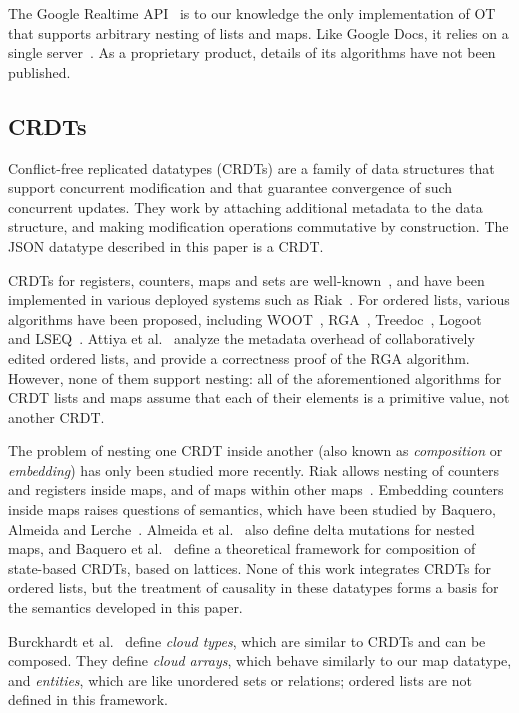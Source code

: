 \documentclass[10pt,journal,compsoc]{IEEEtran}
\begin{document}
The Google Realtime API~\cite{Google:2015vk} is to our knowledge the only implementation of OT that supports arbitrary nesting of lists and maps. Like Google Docs, it relies on a single server~\cite{Lemonik:2016wh}. As a proprietary product, details of its algorithms have not been published.

\subsection{CRDTs}\label{sec:related-crdts}

Conflict-free replicated datatypes (CRDTs) are a family of data structures that support concurrent modification and that guarantee convergence of such concurrent updates. They work by attaching additional metadata to the data structure, and making modification operations commutative by construction. The JSON datatype described in this paper is a CRDT.

CRDTs for registers, counters, maps and sets are well-known~\cite{Shapiro:2011un,Shapiro:2011wy}, and have been implemented in various deployed systems such as Riak~\cite{Brown:2014hs,Brown:2013wy}. For ordered lists, various algorithms have been proposed, including WOOT~\cite{Oster:2006wj}, RGA~\cite{Roh:2011dw}, Treedoc~\cite{Preguica:2009fz}, Logoot~\cite{Weiss:2010hx} and LSEQ~\cite{Nedelec:2013ky}. Attiya et al.~\cite{Attiya:2016kh} analyze the metadata overhead of collaboratively edited ordered lists, and provide a correctness proof of the RGA algorithm. However, none of them support nesting: all of the aforementioned algorithms for CRDT lists and maps assume that each of their elements is a primitive value, not another CRDT.

The problem of nesting one CRDT inside another (also known as \emph{composition} or \emph{embedding}) has only been studied more recently. Riak allows nesting of counters and registers inside maps, and of maps within other maps~\cite{Brown:2014hs,Brown:2013wy}. Embedding counters inside maps raises questions of semantics, which have been studied by Baquero, Almeida and Lerche~\cite{Baquero:2016iv}. Almeida et al.~\cite{Almeida:2016tk} also define delta mutations for nested maps, and Baquero et al.~\cite{Baquero:2015tm} define a theoretical framework for composition of state-based CRDTs, based on lattices. None of this work integrates CRDTs for ordered lists, but the treatment of causality in these datatypes forms a basis for the semantics developed in this paper.

Burckhardt et al.~\cite{Burckhardt:2012jy} define \emph{cloud types}, which are similar to CRDTs and can be composed. They define \emph{cloud arrays}, which behave similarly to our map datatype, and \emph{entities}, which are like unordered sets or relations; ordered lists are not defined in this framework.
\end{document}
